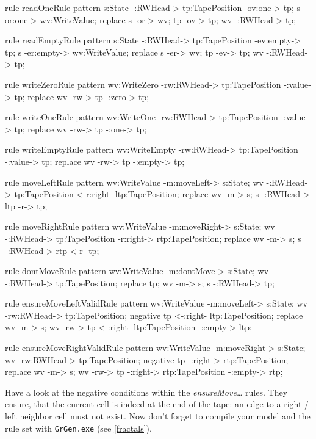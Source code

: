 \begin{grgen}[firstnumber=last] 
rule readOneRule {
	pattern {
		s:State -:RWHead-> tp:TapePosition -ov:one-> tp;
		s -or:one-> wv:WriteValue;
	}
	replace {
		s -or-> wv;
		tp -ov-> tp;
		wv -:RWHead-> tp;
	}
}

rule readEmptyRule {
	pattern {
		s:State -:RWHead-> tp:TapePosition -ev:empty-> tp;
		s -er:empty-> wv:WriteValue;
	}
	replace {
		s -er-> wv;
		tp -ev-> tp;
		wv -:RWHead-> tp;
	}
}

rule writeZeroRule {
	pattern {
		wv:WriteZero -rw:RWHead-> tp:TapePosition -:value-> tp;
	}
	replace {
		wv -rw-> tp -:zero-> tp;
	}	
}

rule writeOneRule {
	pattern {
		wv:WriteOne -rw:RWHead-> tp:TapePosition -:value-> tp;
	}
	replace {
		wv -rw-> tp -:one-> tp;
	}	
}

rule writeEmptyRule {
	pattern {
		wv:WriteEmpty -rw:RWHead-> tp:TapePosition -:value-> tp;
	}
	replace {
		wv -rw-> tp -:empty-> tp;
	}	
}

rule moveLeftRule {
	pattern {
		wv:WriteValue -m:moveLeft-> s:State;
		wv -:RWHead-> tp:TapePosition <-r:right- ltp:TapePosition;
	}
	replace {
		wv -m-> s;
		s -:RWHead-> ltp -r-> tp;
	}
}

rule moveRightRule {
	pattern {
		wv:WriteValue -m:moveRight-> s:State;
		wv -:RWHead-> tp:TapePosition -r:right-> rtp:TapePosition;
	}
	replace {
		wv -m-> s;
		s -:RWHead-> rtp <-r- tp;
	}
}

rule dontMoveRule {
	pattern {
		wv:WriteValue -m:dontMove-> s:State;
		wv -:RWHead-> tp:TapePosition;
	}
	replace {
		tp;
		wv -m-> s;
		s -:RWHead-> tp;
	}
}

rule ensureMoveLeftValidRule {
	pattern {
		wv:WriteValue -m:moveLeft-> s:State;
		wv -rw:RWHead-> tp:TapePosition;
		negative {
			tp <-:right- ltp:TapePosition;
		}
	}
	replace {
		wv -m-> s;
		wv -rw-> tp <-:right- ltp:TapePosition -:empty-> ltp;
	}
}

rule ensureMoveRightValidRule {
	pattern {
		wv:WriteValue -m:moveRight-> s:State;
		wv -rw:RWHead-> tp:TapePosition;
		negative {
			tp -:right-> rtp:TapePosition;
		}
	}
	replace {
		wv -m-> s;
		wv -rw-> tp -:right-> rtp:TapePosition -:empty-> rtp;
	}
}
\end{grgen}
Have a look at the negative conditions within the \emph{ensureMove\dots} rules. They ensure, that the current cell is indeed at the end of the tape: an edge to a right / left neighbor cell must not exist. Now don't forget to compile your model and the rule set with \texttt{GrGen.exe} (see \ref{fractals}).

